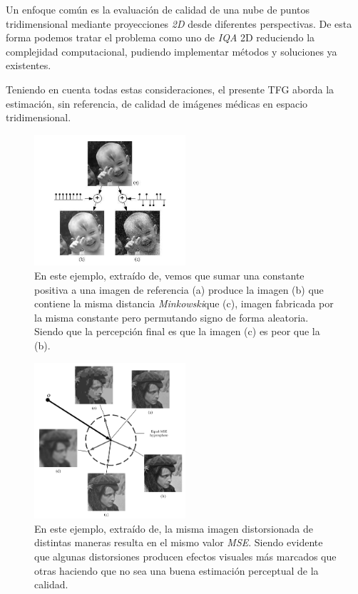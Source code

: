 Un enfoque común es la evaluación de calidad de una nube de puntos tridimensional 
mediante proyecciones \emph{2D} desde diferentes perspectivas\cite{IT-PCQA, VQA-PC, MM-PCQA}. 
De esta forma podemos tratar el problema como uno de \emph{IQA} 2D reduciendo la 
complejidad computacional, pudiendo implementar métodos y soluciones ya existentes.

Teniendo en cuenta todas estas consideraciones, el presente TFG aborda la
estimación, sin referencia, de calidad de imágenes médicas en espacio tridimensional.

\begin{figure}[htp]
  \begin{center}
    \includegraphics[width=0.5\textwidth]{imagenes/chapter2/failure_minkowski_metric.png}
  \end{center}
  \caption{En este ejemplo, extraído de\cite{MinkowskiFailure},
  vemos que sumar una constante positiva a una imagen  de referencia (a) produce la imagen (b) que contiene la misma distancia \emph{Minkowski}\footnotemark[1]
  que (c), imagen fabricada por la misma constante pero permutando signo de forma aleatoria. Siendo que
  la percepción final es que la imagen (c) es peor que la (b).
\label{fig:FailureMinkowskiMetric}}
\end{figure}
\begin{figure}[htp]
  \begin{center}
    \includegraphics[width=0.5\textwidth]{imagenes/chapter2/MSE_Hypersphere.png}
  \end{center}
  \caption{En este ejemplo, extraído de\cite{Wang2006ModernIQ}, la misma imagen distorsionada de distintas maneras
  resulta en el mismo valor \emph{MSE}. Siendo evidente que 
  algunas distorsiones producen efectos visuales más marcados que otras haciendo 
  que no sea una buena estimación perceptual de la calidad.}
  \label{fig:MSEHyperSphere}
\end{figure}

